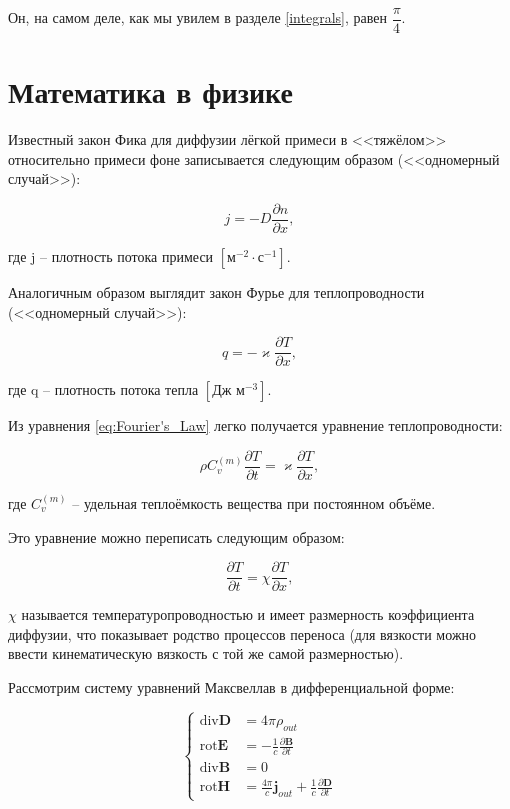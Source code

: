 \documentclass[a4paper,12pt]{article}
\DeclareMathOperator{\divergence}{\mathop{div}} %
\DeclareMathOperator{\rot}{\mathop{rot}} %
\begin{document}
Он, на самом деле, как мы увилем в разделе \ref{integrals}, равен $\dfrac{\pi}{4}$.



\section{Математика в физике}\label{phys_and_math}

Известный закон Фика для диффузии лёгкой примеси в <<тяжёлом>> относительно примеси фоне записывается следующим образом (<<одномерный случай>>):

\begin{equation}%
j = -D\frac{\partial n}{\partial x},
\end{equation}

где j -- плотность потока примеси $\left[ \text{м}^{-2} \cdot \text{с}^{-1}\right]$.

Аналогичным образом выглядит закон Фурье для теплопроводности (<<одномерный случай>>):

\begin{equation}\label{eq:Fourier's_Law}
q = -\varkappa\frac{\partial T}{\partial x},
\end{equation}

где q -- плотность потока тепла $\left[ \text{Дж}\text{ м}^{-3}\right]$.

Из уравнения \eqref{eq:Fourier's_Law} легко получается уравнение теплопроводности:

\begin{equation}\label{eq:thermal_conductivity}
\rho C_{\textit{v}}^{(m)}\frac{\partial T}{\partial t} = \varkappa\frac{\partial T}{\partial x},
\end{equation}

где $C_{\textit{v}}^{(m)}$ -- удельная теплоёмкость вещества при постоянном объёме.

Это уравнение можно переписать следующим образом:

\[
\frac{\partial T}{\partial t} = \chi\frac{\partial T}{\partial x},
\]

$\chi$ называется температуропроводностью и имеет размерность коэффициента диффузии, что показывает родство процессов переноса (для вязкости можно ввести кинематическую вязкость с той же самой размерностью).

Рассмотрим систему уравнений Максвеллав в дифференциальной форме:

\[ \left\{
	\begin{aligned}
		\divergence \textbf{D} &= 4\pi\rho_{out} \\
		\rot \textbf{E} &= - \frac{1}{c} \frac{\partial \textbf{B}}{\partial t} \\
		\divergence \textbf{B} &= 0 \\
		\rot \textbf{H} &= \frac{4 \pi}{c} \textbf{j}_{out} + \frac{1}{c} \frac{\partial \textbf{D}}{\partial t}
	\end{aligned}
\right.
\]
\end{document}
